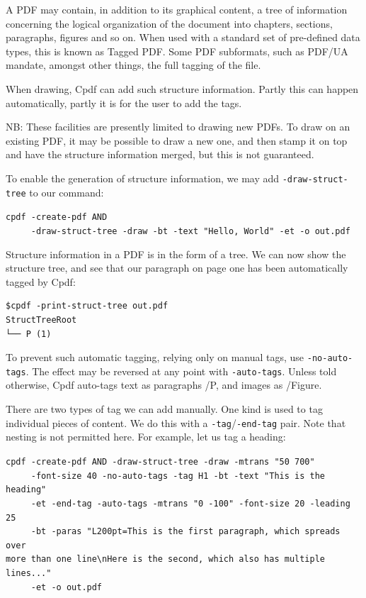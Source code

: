 \documentclass{book}
\begin{document}
A PDF may contain, in addition to its graphical content, a tree of information concerning the logical organization of the document into chapters, sections, paragraphs, figures and so on. When used with a standard set of pre-defined data types, this is known as Tagged PDF. Some PDF subformats, such as PDF/UA mandate, amongst other things, the full tagging of the file.

When drawing, Cpdf can add such structure information. Partly this can happen automatically, partly it is for the user to add the tags.

NB: These facilities are presently limited to drawing new PDFs. To draw on an existing PDF, it may be possible to draw a new one, and then stamp it on top and have the structure information merged, but this is not guaranteed.

To enable the generation of structure information, we may add \texttt{-draw-struct-tree} to our command:

\begin{framed}
   \noindent\small\verb!cpdf -create-pdf AND!\\
   \noindent\small\verb!     -draw-struct-tree -draw -bt -text "Hello, World" -et -o out.pdf!
\end{framed}

\noindent Structure information in a PDF is in the form of a tree. We can now show the structure tree, and see that our paragraph on page one has been automatically tagged by Cpdf:

\begin{verbatim}
$cpdf -print-struct-tree out.pdf
StructTreeRoot
└── P (1)\end{verbatim}

\noindent To prevent such automatic tagging, relying only on manual tags, use \texttt{-no-auto-tags}. The effect may be reversed at any point with \texttt{-auto-tags}. Unless told otherwise, Cpdf auto-tags text as paragraphs /P, and images as /Figure.

There are two types of tag we can add manually. One kind is used to tag individual pieces of content. We do this with a \texttt{-tag}/\texttt{-end-tag} pair. Note that nesting is not permitted here. For example, let us tag a heading:

\begin{framed}
   \noindent\small\verb!cpdf -create-pdf AND -draw-struct-tree -draw -mtrans "50 700" !\\
   \noindent\small\verb!     -font-size 40 -no-auto-tags -tag H1 -bt -text "This is the heading"!\\
   \noindent\small\verb!     -et -end-tag -auto-tags -mtrans "0 -100" -font-size 20 -leading 25!\\
   \noindent\small\verb!     -bt -paras "L200pt=This is the first paragraph, which spreads over!\\
   \noindent\small\verb!more than one line\nHere is the second, which also has multiple lines..."!\\
   \noindent\small\verb!     -et -o out.pdf!
\end{framed}
\end{document}
